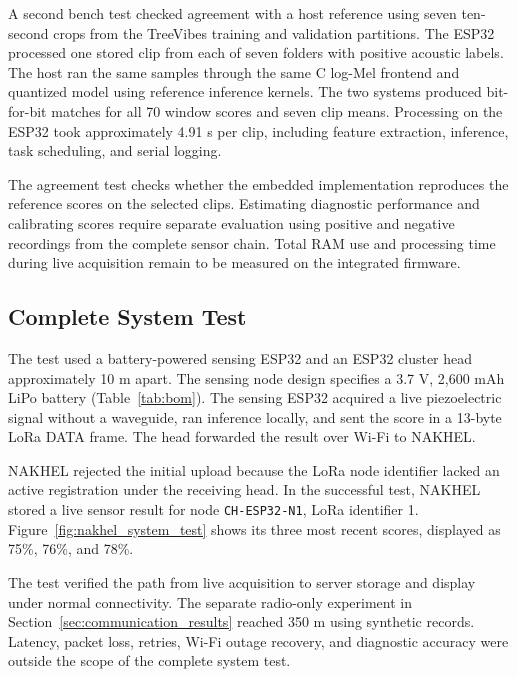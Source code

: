 \documentclass[12pt,a4paper,oneside]{memoir}
\newcommand{\newrevision}[1]{#1}
\begin{document}
\newrevision{A second bench test checked agreement with a host reference using seven ten-second crops from the TreeVibes training and validation partitions. The ESP32 processed one stored clip from each of seven folders with positive acoustic labels. The host ran the same samples through the same C log-Mel frontend and quantized model using reference inference kernels. The two systems produced bit-for-bit matches for all 70 window scores and seven clip means. Processing on the ESP32 took approximately 4.91 s per clip, including feature extraction, inference, task scheduling, and serial logging.}

\newrevision{The agreement test checks whether the embedded implementation reproduces the reference scores on the selected clips. Estimating diagnostic performance and calibrating scores require separate evaluation using positive and negative recordings from the complete sensor chain. Total RAM use and processing time during live acquisition remain to be measured on the integrated firmware.}

\FloatBarrier







\subsection{\newrevision{Complete System Test}}
\label{sec:complete_system_test}

\newrevision{The test used a battery-powered sensing ESP32 and an ESP32 cluster head approximately 10 m apart. The sensing node design specifies a 3.7 V, 2,600 mAh LiPo battery (Table~\ref{tab:bom}). The sensing ESP32 acquired a live piezoelectric signal without a waveguide, ran inference locally, and sent the score in a 13-byte LoRa DATA frame. The head forwarded the result over Wi-Fi to NAKHEL.}

\newrevision{NAKHEL rejected the initial upload because the LoRa node identifier lacked an active registration under the receiving head. In the successful test, NAKHEL stored a live sensor result for node \texttt{CH-ESP32-N1}, LoRa identifier 1. Figure~\ref{fig:nakhel_system_test} shows its three most recent scores, displayed as 75\%, 76\%, and 78\%.}

\newrevision{The test verified the path from live acquisition to server storage and display under normal connectivity. The separate radio-only experiment in Section~\ref{sec:communication_results} reached 350 m using synthetic records. Latency, packet loss, retries, Wi-Fi outage recovery, and diagnostic accuracy were outside the scope of the complete system test.}
\end{document}
